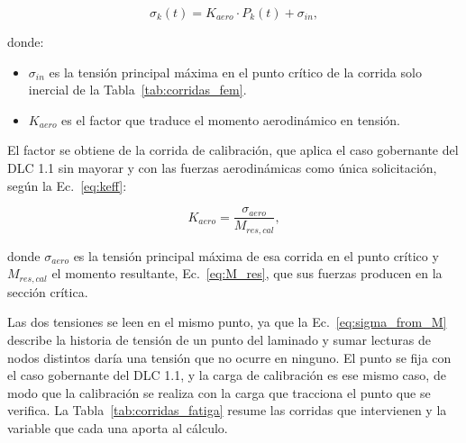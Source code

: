 \begin{equation}
    \sigma_k(t) = K_{aero} \cdot P_k(t) + \sigma_{in},
    \label{eq:sigma_from_M}
\end{equation}

donde:
\begin{itemize}
    \item $\sigma_{in}$ es la tensión principal máxima en el punto crítico de la corrida solo inercial de la Tabla~\ref{tab:corridas_fem}.
    \item $K_{aero}$ es el factor que traduce el momento aerodinámico en tensión.
\end{itemize}

El factor se obtiene de la corrida de calibración, que aplica el caso gobernante del DLC 1.1 sin mayorar y con las fuerzas aerodinámicas como única solicitación, según la Ec.~\ref{eq:keff}:

\begin{equation}
    K_{aero} = \frac{\sigma_{aero}}{M_{res,cal}},
    \label{eq:keff}
\end{equation}

donde $\sigma_{aero}$ es la tensión principal máxima de esa corrida en el punto crítico y $M_{res,cal}$ el momento resultante, Ec.~\ref{eq:M_res}, que sus fuerzas producen en la sección crítica.

Las dos tensiones se leen en el mismo punto, ya que la Ec.~\ref{eq:sigma_from_M} describe la historia de tensión de un punto del laminado y sumar lecturas de nodos distintos daría una tensión que no ocurre en ninguno. El punto se fija con el caso gobernante del DLC 1.1, y la carga de calibración es ese mismo caso, de modo que la calibración se realiza con la carga que tracciona el punto que se verifica. La Tabla~\ref{tab:corridas_fatiga} resume las corridas que intervienen y la variable que cada una aporta al cálculo.

